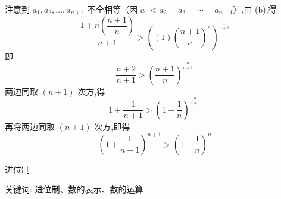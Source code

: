 \begin{questions}
\begin{parts}
\begin{subparts}
\begin{solution}
注意到 $a_1,a_2,\ldots,a_{n+1}$ 不全相等（因 $a_1<a_2=a_3=\cdots=a_{n+1}$）,由 (b),得
\[
\frac{1+n\left(\dfrac{n+1}{n}\right)}{n+1}>\left((1)\left(\frac{n+1}{n}\right)^n\right)^{\frac{1}{n+1}}
\]
即
\[
\frac{n+2}{n+1}>\left(\frac{n+1}{n}\right)^{\frac{n}{n+1}}
\]
两边同取 $(n+1)$ 次方,得
\[
1+\frac{1}{n+1}>\left(1+\frac{1}{n}\right)^{\frac{n}{n+1}}
\]
再将两边同取 $(n+1)$ 次方,即得
\[
\left(1+\frac{1}{n+1}\right)^{n+1}>\left(1+\frac{1}{n}\right)^{n}
\]
\end{solution}
\end{subparts}
\end{parts}

\end{questions}

\pagebreak

\begin{center}
  {\fontsize{30pt}{26pt}\selectfont
    \hypertarget{进位制}{进位制} \label{进位制}
  }
\end{center}
\separator
\begin{center}
    关键词: 进位制、数的表示、数的运算
\end{center}
\vspace{0.5pt}
